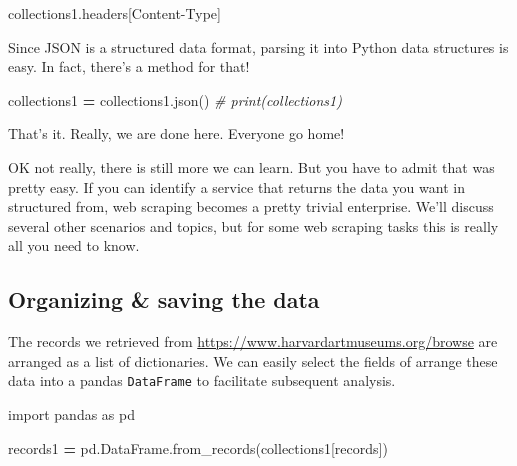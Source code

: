 \documentclass[
]{book}
\newenvironment{Shaded}{\begin{snugshade}}{\end{snugshade}}
\newcommand{\CommentTok}[1]{\textcolor[rgb]{0.56,0.35,0.01}{\textit{#1}}}
\newcommand{\ImportTok}[1]{#1}
\newcommand{\NormalTok}[1]{#1}
\newcommand{\OperatorTok}[1]{\textcolor[rgb]{0.81,0.36,0.00}{\textbf{#1}}}
\newcommand{\StringTok}[1]{\textcolor[rgb]{0.31,0.60,0.02}{#1}}
\begin{document}
\begin{Shaded}
\begin{Highlighting}[]
\NormalTok{collections1.headers[}\StringTok{\textquotesingle{}Content{-}Type\textquotesingle{}}\NormalTok{]}
\end{Highlighting}
\end{Shaded}

Since JSON is a structured data format, parsing it into Python data structures is easy. In fact, there's a method for that!

\begin{Shaded}
\begin{Highlighting}[]
\NormalTok{collections1 }\OperatorTok{=}\NormalTok{ collections1.json()}
\CommentTok{\# print(collections1)}
\end{Highlighting}
\end{Shaded}

That's it. Really, we are done here. Everyone go home!

OK not really, there is still more we can learn. But you have to admit that was pretty easy. If you can identify a service that returns the data you want in structured from, web scraping becomes a pretty trivial enterprise. We'll discuss several other scenarios and topics, but for some web scraping tasks this is really all you need to know.

\hypertarget{organizing-saving-the-data}{%
\subsection{Organizing \& saving the data}\label{organizing-saving-the-data}}

The records we retrieved from \url{https://www.harvardartmuseums.org/browse} are arranged as a list of dictionaries. We can easily select the fields of arrange these data into a pandas \texttt{DataFrame} to facilitate subsequent analysis.

\begin{Shaded}
\begin{Highlighting}[]
\ImportTok{import}\NormalTok{ pandas }\ImportTok{as}\NormalTok{ pd}
\end{Highlighting}
\end{Shaded}

\begin{Shaded}
\begin{Highlighting}[]
\NormalTok{records1 }\OperatorTok{=}\NormalTok{ pd.DataFrame.from\_records(collections1[}\StringTok{\textquotesingle{}records\textquotesingle{}}\NormalTok{])}
\end{Highlighting}
\end{Shaded}
\end{document}
